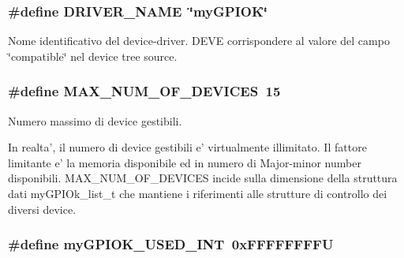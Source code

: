 \hypertarget{group___linux-_driver_ga25634d21648ca7fb7a2aca614bafaaeb}{
\subsubsection[{D\+R\+I\+V\+E\+R\+\_\+\+N\+A\+M\+E}]{\setlength{\rightskip}{0pt plus 5cm}\#define D\+R\+I\+V\+E\+R\+\_\+\+N\+A\+M\+E~\char`\"{}my\+G\+P\+I\+O\+K\char`\"{}}}\label{group___linux-_driver_ga25634d21648ca7fb7a2aca614bafaaeb}


Nome identificativo del device-\/driver. D\+E\+V\+E corrispondere al valore del campo \char`\"{}compatible\char`\"{} nel device tree source. 

\hypertarget{group___linux-_driver_gad32bf20eb64878cb958ca6ac9c96c21d}{
\subsubsection[{M\+A\+X\+\_\+\+N\+U\+M\+\_\+\+O\+F\+\_\+\+D\+E\+V\+I\+C\+E\+S}]{\setlength{\rightskip}{0pt plus 5cm}\#define M\+A\+X\+\_\+\+N\+U\+M\+\_\+\+O\+F\+\_\+\+D\+E\+V\+I\+C\+E\+S~15}}\label{group___linux-_driver_gad32bf20eb64878cb958ca6ac9c96c21d}


Numero massimo di device gestibili. 

In realta', il numero di device gestibili e' virtualmente illimitato. Il fattore limitante e' la memoria disponibile ed in numero di Major-\/minor number disponibili. M\+A\+X\+\_\+\+N\+U\+M\+\_\+\+O\+F\+\_\+\+D\+E\+V\+I\+C\+E\+S incide sulla dimensione della struttura dati my\+G\+P\+I\+Ok\+\_\+list\+\_\+t che mantiene i riferimenti alle strutture di controllo dei diversi device. \hypertarget{group___linux-_driver_ga78d3a23bb3381a43eaba8bbf8b1cc750}{
\subsubsection[{my\+G\+P\+I\+O\+K\+\_\+\+U\+S\+E\+D\+\_\+\+I\+N\+T}]{\setlength{\rightskip}{0pt plus 5cm}\#define my\+G\+P\+I\+O\+K\+\_\+\+U\+S\+E\+D\+\_\+\+I\+N\+T~0x\+F\+F\+F\+F\+F\+F\+F\+F\+U}}\label{group___linux-_driver_ga78d3a23bb3381a43eaba8bbf8b1cc750}


